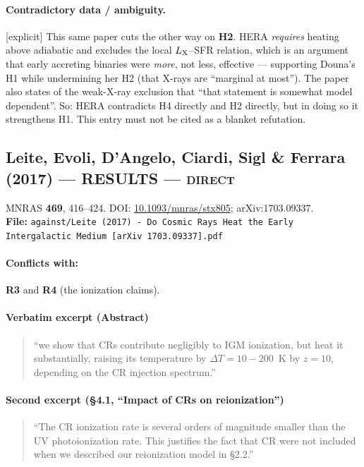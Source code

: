 \documentclass[11pt,a4paper]{article}
\newcommand{\RES}{\textcolor{red!60!black}{\textbf{RESULTS}}}
\newcommand{\flag}[1]{\textcolor{orange!75!black}{\textsf{\small [#1]}}}
\begin{document}
\paragraph{Contradictory data / ambiguity.} \flag{explicit}
This same paper cuts the other way on \textbf{H2}. HERA \emph{requires} heating
above adiabatic and excludes the local $L_{\rm X}$--SFR relation, which is an
argument that early accreting binaries were \emph{more}, not less, effective ---
supporting Douna's H1 while undermining her H2 (that X-rays are ``marginal at
most''). The paper also states of the weak-X-ray exclusion that ``that statement
is somewhat model dependent''. So: HERA contradicts H4 directly and H2
directly, but in doing so it strengthens H1. This entry must not be cited as a
blanket refutation.

\subsection{Leite, Evoli, D'Angelo, Ciardi, Sigl \& Ferrara (2017) --- \RES{} --- \textsc{direct}}
\noindent MNRAS \textbf{469}, 416--424. DOI:
\href{https://doi.org/10.1093/mnras/stx805}{10.1093/mnras/stx805};
arXiv:1703.09337.\\
\textbf{File:} \texttt{against/Leite (2017) - Do Cosmic Rays Heat the Early Intergalactic Medium [arXiv 1703.09337].pdf}

\paragraph{Conflicts with:} \textbf{R3} and \textbf{R4} (the ionization claims).

\paragraph{Verbatim excerpt (Abstract)}
\begin{quote}\small
``we show that CRs contribute negligibly to IGM ionization, but heat it
substantially, raising its temperature by $\Delta T = 10 - 200$~K by $z = 10$,
depending on the CR injection spectrum.''
\end{quote}

\paragraph{Second excerpt (\S4.1, ``Impact of CRs on reionization'')}
\begin{quote}\small
``The CR ionization rate is several orders of magnitude smaller than the UV
photoionization rate. This justifies the fact that CR were not included when we
described our reionization model in \S2.2.''
\end{quote}
\end{document}
